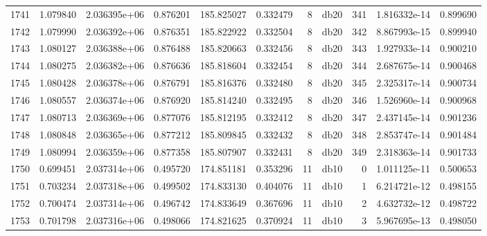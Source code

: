 \begin{tabular}{lrrrrrrlrrr}
1741 &    1.079840 &        2.036395e+06 &  0.876201 &              185.825027 &    0.332479 &       8 &         db20 &    341 &   1.816332e-14 &      0.899690 \\
1742 &    1.079990 &        2.036392e+06 &  0.876351 &              185.822922 &    0.332504 &       8 &         db20 &    342 &   8.867993e-15 &      0.899940 \\
1743 &    1.080127 &        2.036388e+06 &  0.876488 &              185.820663 &    0.332456 &       8 &         db20 &    343 &   1.927933e-14 &      0.900210 \\
1744 &    1.080275 &        2.036382e+06 &  0.876636 &              185.818604 &    0.332454 &       8 &         db20 &    344 &   2.687675e-14 &      0.900468 \\
1745 &    1.080428 &        2.036378e+06 &  0.876791 &              185.816376 &    0.332480 &       8 &         db20 &    345 &   2.325317e-14 &      0.900734 \\
1746 &    1.080557 &        2.036374e+06 &  0.876920 &              185.814240 &    0.332495 &       8 &         db20 &    346 &   1.526960e-14 &      0.900968 \\
1747 &    1.080713 &        2.036369e+06 &  0.877076 &              185.812195 &    0.332412 &       8 &         db20 &    347 &   2.437145e-14 &      0.901236 \\
1748 &    1.080848 &        2.036365e+06 &  0.877212 &              185.809845 &    0.332432 &       8 &         db20 &    348 &   2.853747e-14 &      0.901484 \\
1749 &    1.080994 &        2.036359e+06 &  0.877358 &              185.807907 &    0.332431 &       8 &         db20 &    349 &   2.318363e-14 &      0.901733 \\
1750 &    0.699451 &        2.037314e+06 &  0.495720 &              174.851181 &    0.353296 &      11 &         db10 &      0 &   1.011125e-11 &      0.500653 \\
1751 &    0.703234 &        2.037318e+06 &  0.499502 &              174.833130 &    0.404076 &      11 &         db10 &      1 &   6.214721e-12 &      0.498155 \\
1752 &    0.700474 &        2.037314e+06 &  0.496742 &              174.833649 &    0.367696 &      11 &         db10 &      2 &   4.632732e-12 &      0.498722 \\
1753 &    0.701798 &        2.037316e+06 &  0.498066 &              174.821625 &    0.370924 &      11 &         db10 &      3 &   5.967695e-13 &      0.498050 \\

\end{tabular}
